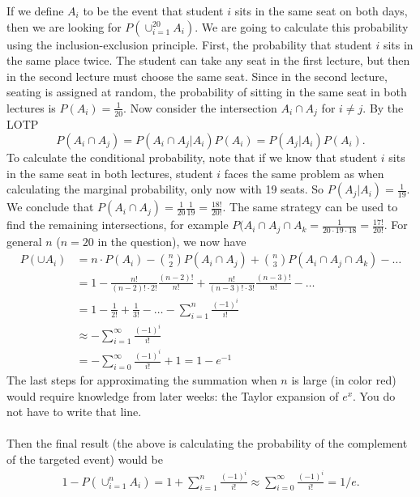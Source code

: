 
\setcounter{theorem}{51}
\begin{exercise}[BH.1.52]
\begin{solution}
	If we define $A_{i}$ to be the event that student $i$ sits in the same seat on both days, then we are looking for
	$P(\cup_{i=1}^{20}A_{i})$. We are going to calculate this probability using the inclusion-exclusion principle. First, the probability that student $i$ sits in the same place twice. The student can take any seat in the first lecture, but then in the second lecture must choose the same seat. Since in the second lecture, seating is assigned at random, the probability of sitting in the same seat in both lectures is $P(A_{i})=\frac{1}{20}$. Now consider the intersection $A_{i}\cap A_{j}$ for $i\neq j$. By the LOTP $$P(A_{i}\cap A_{j}) = P(A_{i}\cap A_{j}|A_{i})P(A_{i})=P(A_{j}|A_{i})P(A_{i}).$$ To calculate the conditional probability, note that if we know that student $i$ sits in the same seat in both lectures, student $i$ faces the same problem as when calculating the marginal probability, only now with 19 seats. So $P(A_{j}|A_{i}) = \frac{1}{19}$. We conclude that $P(A_{i}\cap A_{j})=\frac{1}{20}\frac{1}{19} = \frac{18!}{20!}$. The same strategy can be used to find the remaining intersections, for example $P(A_{i}\cap A_{j}\cap A_{k} =\frac{1}{20\cdot 19\cdot 18} = \frac{17!}{20!}$. For general $n$ ($n=20$ in the question), we now have
	\begin{align*}
		P(\cup A_{i}) &= n\cdot P(A_{i}) - {n \choose 2}P(A_{i}\cap A_{j}) + {n \choose 3}P(A_{i}\cap A_{j}\cap A_{k})-\ldots\\
		& = 1 - \frac{n!}{(n-2)!\cdot 2!}\frac{(n-2)!}{n!} + \frac{n!}{(n-3)!\cdot 3!}\frac{(n-3)!}{n!} -\ldots\\
		& = 1-\frac{1}{2!}+\frac{1}{3!}-\ldots
		-\sum_{i=1}^{n} \frac{(-1)^{i}}{i!}\\
		& \approx -\sum_{i=1}^{\infty} \frac{(-1)^{i}}{i!}\\ 
		& = -\sum_{i=0}^{\infty} \frac{(-1)^{i}}{i!} +1 =1-e^{-1}
	\end{align*}
The last steps for approximating the summation when $n$ is large (in color red) would require knowledge from later weeks: the Taylor expansion of $e^x$. You do not have to write that line.\\~\\
Then the final result (the above is calculating the probability of the  complement of the targeted event) would be 
\begin{align*}
1-P(\cup_{i=1}^{n} A_{i}) = 1+ \sum_{i=1}^{n} \frac{(-1)^{i}}{i!} { \approx \sum_{i=0}^{\infty} \frac{(-1)^{i}}{i!} =1/e. }
\end{align*} 
\end{solution}
\end{exercise}


